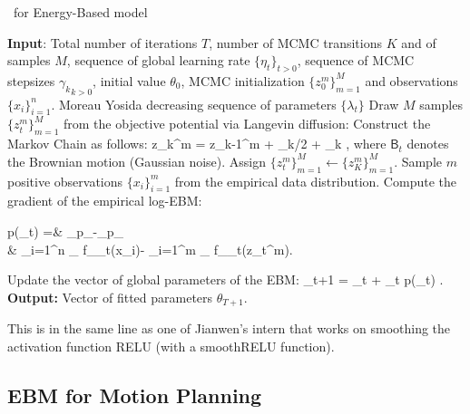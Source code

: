 \documentclass{article}
\begin{document}
\begin{algorithm}[H]
\caption{\algo\ for Energy-Based model} \label{alg:anila}
\begin{algorithmic}[1]
\STATE \textbf{Input}: Total number of iterations $T$, number of MCMC transitions $K$ and of samples $M$, sequence of global learning rate $\{\eta_t\}_{t >0}$,  sequence of MCMC stepsizes ${\gamma_k}_{k >0}$, initial value $\theta_0$, MCMC initialization $\{ z_{0}^m \}_{m=1}^M$ and observations $\{ x_{i} \}_{i=1}^n$. Moreau Yosida decreasing sequence of parameters $\{\lambda_t\}$
\STATE Draw $M$ samples $\{ z_{t}^m \}_{m=1}^M$ from the objective potential via Langevin diffusion:\label{line:langevin}
\STATE Construct the Markov Chain as follows:
\beq\label{eq:anila}
z_{k}^{m} = z_{k-1}^m + \gamma_k/2   +  _k \eqsp,
\eeq
where $\mathsf{B}_t$ denotes the Brownian motion (Gaussian noise).
\ENDFOR
\STATE Assign $\{ z_{t}^m \}_{m=1}^M \leftarrow \{ z_{K}^m \}_{m=1}^M$.
\STATE Sample $m$ positive observations $\{ x_{i} \}_{i=1}^m$ from the empirical data distribution.
\STATE Compute the gradient of the empirical log-EBM:
\beq\notag
\begin{split}
\nabla \log p(\theta_t) 
 =& _{p_{}}-_{p_{\theta}}\\
 &\hspace{-0.6in}\approx  {} \sum_{i=1}^{n} \nabla_{\theta} f_{\theta_t}\left(x_{i}\right)- \sum_{i=1}^{m} \nabla_{\theta} f_{\theta_t}\left(z_t^m\right)\eqsp.
\end{split}
\eeq
\STATE Update the vector of global parameters of the EBM:\label{line:gradient}
\beq\notag
\theta_{t+1} = \theta_{t} + \eta_t \nabla \log p(\theta_t) \eqsp.
\eeq
\ENDFOR
\STATE \textbf{Output:} Vector of fitted parameters $\theta_{T+1}$.
\end{algorithmic}
\end{algorithm}

This is in the same line as one of Jianwen's intern that works on smoothing the activation function RELU (with a smoothRELU function).



\subsection{EBM for Motion Planning}
\end{document}
